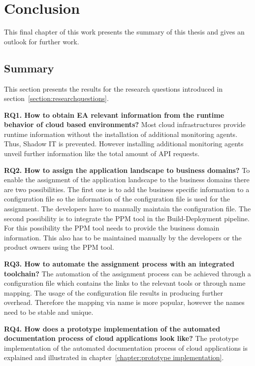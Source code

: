 
\chapter{Conclusion}\label{chapter:Conclusion}

This final chapter of this work presents the summary of this thesis and gives an outlook for further work.

\section{Summary}

This section presents the results for the research questions introduced in section~\ref{section:researchquestions}.

\textbf{RQ1. How to obtain EA relevant information from the runtime behavior of cloud based environments?}
Most cloud infrastructures provide runtime information without the installation of additional monitoring agents. Thus, Shadow IT is prevented. However installing additional monitoring agents unveil further information like the total amount of API requests.  

\textbf{RQ2. How to assign the application landscape to business domains?}
To enable the assignment of the application landscape to the business domains there are two possibilities. The first one is to add the business specific information to a configuration file so the information of the configuration file is used for the assignment. The developers have to manually maintain the configuration file. The second possibility is to integrate the PPM tool in the Build-Deployment pipeline. For this possibility the PPM tool needs to provide the business domain information. This also has to be maintained manually by the developers or the product owners using the PPM tool.

\textbf{RQ3. How to automate the assignment process with an integrated toolchain?}
The automation of the assignment process can be achieved through a configuration file which contains the links to the relevant tools or through name mapping. The usage of the configuration file results in producing further overhead. Therefore the mapping via name is more popular, however the names need to be stable and unique.

\textbf{RQ4. How does a prototype implementation of the automated documentation process of cloud applications look like?}
The prototype implementation of the automated documentation process of cloud applications is explained and illustrated in chapter~\ref{chapter:prototype implementation}.

